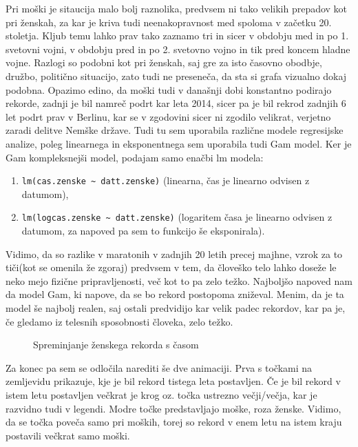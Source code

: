 \documentclass[11pt,a4paper]{article}
\begin{document}
Pri moški je sitaucija malo bolj raznolika, predvsem ni tako velikih prepadov kot pri ženskah, za kar je kriva tudi neenakopravnost med spoloma v začetku 20. stoletja. Kljub temu lahko prav tako zaznamo tri in sicer v obdobju med in po 1. svetovni vojni, v obdobju pred in po 2. svetovno vojno in tik pred koncem hladne vojne. Razlogi so podobni kot pri ženskah, saj gre za isto časovno obodbje, družbo, politično situacijo, zato tudi ne preseneča, da sta si grafa vizualno dokaj podobna. Opazimo edino, da moški tudi v današnji dobi konstantno podirajo rekorde, zadnji je bil namreč podrt kar leta 2014, sicer pa je bil rekrod zadnjih 6 let podrt prav v Berlinu, kar se v zgodovini sicer ni zgodilo velikrat, verjetno zaradi delitve Nemške države.
Tudi tu sem uporabila različne modele regresijske analize, poleg linearnega in  eksponentnega sem uporabila tudi Gam model. Ker je Gam kompleksnejši model, podajam samo enačbi lm modela:
\begin{enumerate}
\item{\verb|lm(cas.zenske ~ datt.zenske)| (linearna, čas je linearno odvisen z datumom),}
\item{\verb|lm(logcas.zenske ~ datt.zenske)| (logaritem časa je linearno odvisen z datumom, za napoved pa sem to funkcijo še eksponirala).}
\end{enumerate}
Vidimo, da so razlike v maratonih v zadnjih 20 letih precej majhne, vzrok za to tiči(kot se omenila že zgoraj) predvsem v tem, da človeško telo lahko doseže le neko mejo fizične pripravljenosti, več kot to pa zelo težko. Najboljšo napoved nam da model Gam, ki napove, da se bo rekord postopoma zniževal. Menim, da je ta model še najbolj realen, saj ostali predvidijo kar velik padec rekordov, kar pa je, če gledamo iz telesnih sposobnosti človeka, zelo težko.


\begin{figure}[H]
  \caption{Spreminjanje ženskega rekorda s časom}
  \label{fig:Slika 5}
\end{figure}

\newpage
Za konec pa sem se odločila narediti še dve animaciji. Prva s točkami na zemljevidu prikazuje, kje je bil rekord tistega leta postavljen. Če je bil rekord v istem letu postavljen večkrat je krog oz. točka ustrezno večji/večja, kar je razvidno tudi v legendi. Modre točke predstavljajo moške, roza ženske.
Vidimo, da se točka poveča samo pri moških, torej so rekord v enem letu na istem kraju postavili večkrat samo moški.
\end{document}
